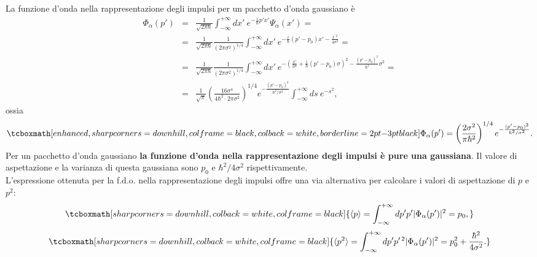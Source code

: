 \documentclass[a4paper,12pt,oneside]{book}
\begin{document}
La funzione d'onda nella rappresentazione degli impulsi per un pacchetto d'onda gaussiano è
	\begin{eqnarray}
		\Phi_\alpha(p') &=& \frac{1}{\sqrt{2 \pi \hbar}} \int_{-\infty}^{+\infty} dx'~ e^{-\frac{i}{\hbar} p' x'} \Psi_\alpha(x') = \nonumber \\
		&=& \frac{1}{\sqrt{2 \pi \hbar}} \frac{1}{(2 \pi \sigma^2)^{1/4}} \int_{-\infty}^{+\infty} dx'~ e^{-\frac{i}{\hbar} (p'-p_0) x' - \frac{x^{\prime \, 2}}{4 \sigma^2}} = \nonumber \\
		&=& \frac{1}{\sqrt{2 \pi \hbar}} \frac{1}{(2 \pi \sigma^2)^{1/4}} \int_{-\infty}^{+\infty} dx'~ e^{-\left(\frac{x'}{2 \sigma} + \frac{i}{\hbar} (p'-p_0) \sigma \right)^2 - \frac{(p'-p_0)^2}{\hbar^2}\sigma^2} = \nonumber \\
		&=&  \frac{1}{\sqrt{\pi}} \left(\frac{16 \sigma^4}{4 \hbar^2 \cdot 2 \pi \sigma^2} \right)^{1/4} e^{-\frac{(p'-p_0)^2}{\hbar^2/\sigma^2}} \int_{-\infty}^{+\infty} ds ~e^{-s^2},
	\end{eqnarray}
ossia
	\begin{equation}
		\tcboxmath[enhanced, sharp corners=downhill, colframe=black, colback=white, borderline={2pt}{-3pt}{black}]{
			\Phi_\alpha(p') = \left(\frac{2 \sigma^2}{\pi \hbar^2} \right)^{1/4} e^{-\frac{(p'-p_0)^2}{\hbar^2/\sigma^2}}.
			}
	\end{equation}
Per un pacchetto d'onda gaussiano \textbf{la funzione d'onda nella rappresentazione degli impulsi è pure una gaussiana}. Il valore di aspettazione e la varianza di questa gaussiana sono $p_0$ e $\hbar^2/4 \sigma^2$ rispettivamente.\\

L'espressione ottenuta per la f.d.o. nella rappresentazione degli impulsi offre una via alternativa per calcolare i valori di aspettazione di $p$ e $p^2$:
	\begin{equation}
		\tcboxmath[sharp corners=downhill, colback=white, colframe=black]{
		\langle p \rangle = \int_{-\infty}^{+\infty} dp' p' |\Phi_\alpha(p')|^2 = p_0,
			}
	\end{equation}
	\begin{equation}
		\tcboxmath[sharp corners=downhill, colback=white, colframe=black]{
		\langle p^2 \rangle = \int_{-\infty}^{+\infty} dp' p^{\prime \, 2} |\Phi_\alpha(p')|^2 = p_0^2 + \frac{\hbar^2}{4 \sigma^2}.
			}
	\end{equation}
\end{document}
